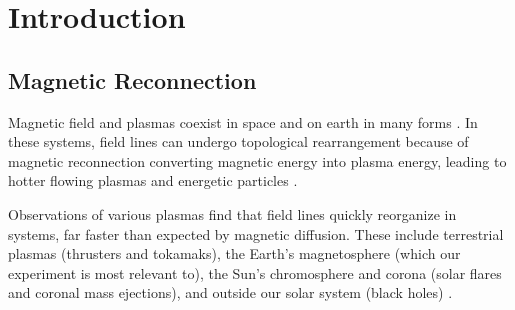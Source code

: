 \chapter{Introduction}

\section{Magnetic Reconnection}

Magnetic field and plasmas coexist in space and on earth in many forms \cite{Zweibel_Yamada_2016}. In these systems, field lines can undergo topological rearrangement because of magnetic reconnection converting magnetic energy into plasma energy, leading to hotter flowing plasmas and energetic particles \cite{Yamada_Kulsrud_Ji_2010}.



Observations of various plasmas find that field lines quickly reorganize in systems, far faster than expected by magnetic diffusion. These include terrestrial plasmas (thrusters \cite{Bathgate_2018} and tokamaks), the Earth's magnetosphere (which our experiment is most relevant to), the Sun's chromosphere and corona (solar flares and coronal mass ejections), and outside our solar system (black holes) \cite{Yamada_Kulsrud_Ji_2010}.




